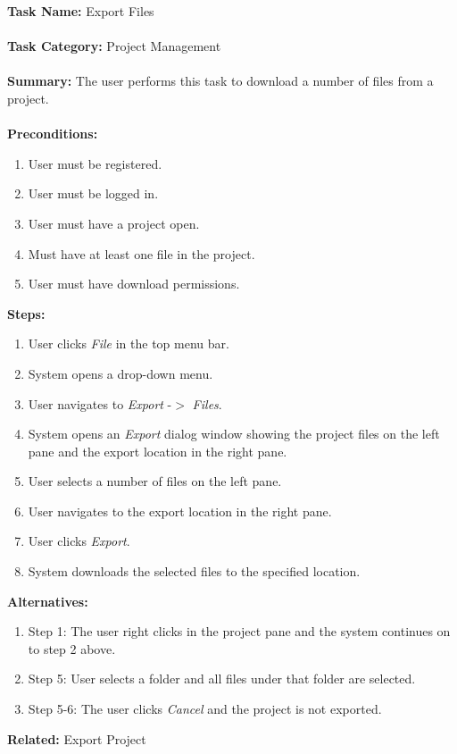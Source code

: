 \documentclass[14pt, a4paper]{article}
\begin{document}
\begin{framed}
	\noindent\textbf{Task Name:} Export Files \\ \\
	\textbf{Task Category:} Project Management \\ \\
	\textbf{Summary:} The user performs this task to download a number of files from a project. \\ \\
	\textbf{Preconditions:} 
	\begin{enumerate}
		\item User must be registered.
		\item User must be logged in.
		\item User must have a project open.
		\item Must have at least one file in the project.
		\item User must have download permissions.
	\end{enumerate}
	\textbf{Steps:}
	\begin{enumerate}
		\item User clicks \textit{File} in the top menu bar.
		\item System opens a drop-down menu.
		\item User navigates to \textit{Export} -$>$ \textit{Files}.
		\item System opens an \textit{Export} dialog window showing the project files on the left pane and the export location in the right pane.
		\item User selects a number of files on the left pane.
		\item User navigates to the export location in the right pane.
		\item User clicks \textit{Export}.
		\item System downloads the selected files to the specified location.
	\end{enumerate}
	\textbf{Alternatives:} 
	\begin{enumerate}
		\item Step 1: The user right clicks in the project pane and the system continues on to step 2 above.
		\item Step 5: User selects a folder and all files under that folder are selected.
		\item Step 5-6: The user clicks \textit{Cancel} and the project is not exported.
	\end{enumerate}
	\textbf{Related:} Export Project
\end{framed}
\end{document}
